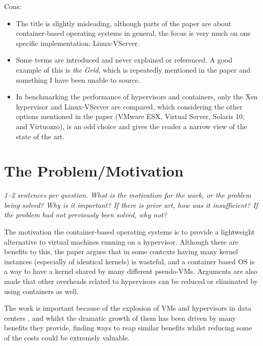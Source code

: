 \documentclass[11pt]{article}
\begin{document}
Cons:

\begin{itemize}

    \item The title is slightly misleading, although parts of the paper are
    about container-based operating systems in general, the focus is very much
    on one specific implementation: Linux-VServer.

    \item Some terms are introduced and never explained or referenced. A good
    example of this is \textit{the Grid}, which is repeatedly mentioned in the
    paper and something I have been unable to source.

    \item In benchmarking the performance of hypervisors and containers, only
    the Xen hypervisor and Linux-VServer are compared, which considering the
    other options mentioned in the paper (VMware ESX, Virtual Server,
    Solaris 10, and Virtuozzo), is an odd choice and gives the reader a narrow
    view of the state of the art.

\end{itemize}

\section*{The Problem/Motivation}

\textsl{1--2 sentences per question. What is the motivation for the work, or
the problem being solved? Why is it important? If there is prior art, how was
it insufficient? If the problem had not previously been solved, why not?}

The motivation the container-based operating systems is to provide a
lightweight alternative to virtual machines running on a hypervisor. Although
there are benefits to this, the paper argues that in some contexts having many
kernel instances (especially of identical kernels) is wasteful, and a container
based OS is a way to have a kernel shared by many different pseudo-VMs.
Arguments are also made that other overheads related to hypervisors can be
reduced or eliminated by using containers as well.

The work is important because of the explosion of VMs and hypervisors in data
centers \cite{VirtualizationGrowth}, and whilst the dramatic growth of them has
been driven by many benefits they provide, finding ways to reap similar
benefits whilst reducing some of the costs could be extremely valuable.
\end{document}
